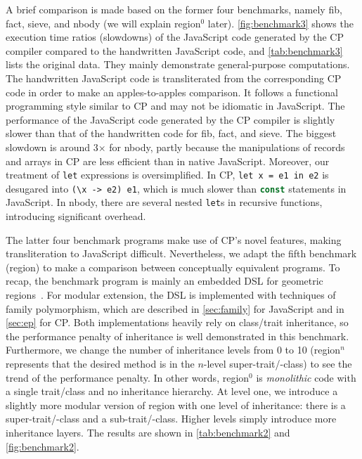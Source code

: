A brief comparison is made based on the former four benchmarks, namely
\textsf{fib}, \textsf{fact}, \textsf{sieve}, and \textsf{nbody} (we will explain
\textsf{region}$^0$ later). \autoref{fig:benchmark3} shows the execution time
ratios (slowdowns) of the JavaScript code generated by the CP compiler compared
to the handwritten JavaScript code, and \autoref{tab:benchmark3} lists the
original data. They mainly demonstrate general-purpose computations. The
handwritten JavaScript code is transliterated from the corresponding CP code in
order to make an apples-to-apples comparison. It follows a functional
programming style similar to CP and may not be idiomatic in JavaScript. The
performance of the JavaScript code generated by the CP compiler is slightly
slower than that of the handwritten code for \textsf{fib}, \textsf{fact}, and
\textsf{sieve}. The biggest slowdown is around 3$\times$ for \textsf{nbody},
partly because the manipulations of records and arrays in CP are less efficient
than in native JavaScript. Moreover, our treatment of \lstinline{let}
expressions is oversimplified. In CP, \lstinline{let x = e1 in e2} is desugared
into \lstinline{(\x -> e2) e1}, which is much slower than
\lstinline[language=TypeScript]{const} statements in JavaScript. In
\textsf{nbody}, there are several nested \lstinline{let}s in recursive
functions, introducing significant overhead.

The latter four benchmark programs make use of CP's novel features, making
transliteration to JavaScript difficult. Nevertheless, we adapt the fifth
benchmark (\textsf{region}) to make a comparison between conceptually equivalent
programs. To recap, the benchmark program is mainly an embedded DSL for
geometric regions~\citep{hudak1998modular}. For modular extension, the DSL is
implemented with techniques of family polymorphism, which are described in
\autoref{sec:family} for JavaScript and in \autoref{sec:ep} for CP. Both
implementations heavily rely on class/trait inheritance, so the performance
penalty of inheritance is well demonstrated in this benchmark. Furthermore, we
change the number of inheritance levels from 0 to 10 (\textsf{region}$^n$
represents that the desired method is in the $n$-level super-trait/-class) to
see the trend of the performance penalty. In other words, \textsf{region}$^0$ is
\emph{monolithic} code with a single trait/class and no inheritance hierarchy.
At level one, we introduce a slightly more modular version of \textsf{region}
with one level of inheritance: there is a super-trait/-class and a
sub-trait/-class. Higher levels simply introduce more inheritance layers. The
results are shown in \autoref{tab:benchmark2} and \autoref{fig:benchmark2}.

